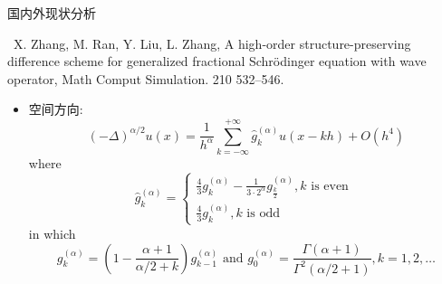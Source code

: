 \documentclass[aspectratio=169]{beamer}
\begin{document}
\begin{frame}{国内外现状分析}
	\begin{exampleblock}{\footnotesize \cite{zhangHighorderStructurepreservingDifference2023} \ X. Zhang, M. Ran, Y. Liu, L. Zhang, A high-order structure-preserving difference scheme for generalized fractional Schrödinger equation with wave operator, Math Comput Simulation. 210 {\color{purple}{(2023)}}  532–546.}
		\footnotesize
		\begin{itemize}
		\item 空间方向:
		\begin{equation*}
			(-\Delta)^{\alpha / 2} u(x)=\frac{1}{h^\alpha} \sum_{k=-\infty}^{+\infty} \widehat{g}_k^{(\alpha)} u(x-k h)+O\left(h^4\right)
			\end{equation*}
			where
			\begin{equation*}
			\widehat{g}_k^{(\alpha)}=\left\{\begin{array}{l}
			\frac{4}{3} g_k^{(\alpha)}-\frac{1}{3 \cdot 2^\alpha} g_{\frac{k}{2}}^{(\alpha)}, k \text { is even } \\
			\frac{4}{3} g_k^{(\alpha)}, k \text { is odd }
			\end{array}\right.
			\end{equation*}
			in which
			\begin{equation*}
			g_k^{(\alpha)}=\left(1-\frac{\alpha+1}{\alpha / 2+k}\right) g_{k-1}^{(\alpha)} \text { and } g_0^{(\alpha)}=\frac{\Gamma(\alpha+1)}{\Gamma^2(\alpha / 2+1)}, k=1,2, \ldots
			\end{equation*}
			\end{itemize}
	\end{exampleblock}
	\end{frame}
\end{document}
